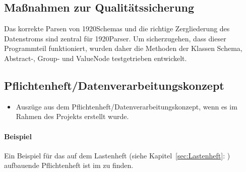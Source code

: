 \subsection{Maßnahmen zur Qualitätssicherung}
\label{sec:Qualitaetssicherung}
Das korrekte Parsen von 1920Schemas und die richtige Zergliederung des Datenstroms sind zentral für 1920Parser. Um sicherzugehen, dass dieser Programmteil funktioniert,  wurden daher die Methoden der Klassen Schema, Abstract-, Group- und ValueNode  testgetrieben entwickelt.

\subsection{Pflichtenheft/Datenverarbeitungskonzept}
\label{sec:Pflichtenheft}
\begin{itemize}
	\item Auszüge aus dem Pflichtenheft/Datenverarbeitungskonzept, wenn es im Rahmen des Projekts erstellt wurde.
\end{itemize}

\paragraph{Beispiel}
Ein Beispiel für das auf dem Lastenheft (siehe Kapitel~\ref{sec:Lastenheft}: ) aufbauende Pflichtenheft ist im  zu finden.


